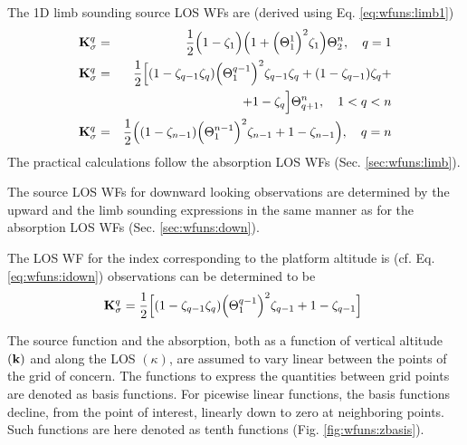   \label{sec:wfuns:limb2}
  The 1D limb sounding source LOS WFs are (derived using Eq.
  \ref{eq:wfuns:limb1})
  \begin{eqnarray}
    \mathbf{K}_{\sigma}^q & = & \frac{1}{2} \Big(1-\zeta_1\Big) \Big(1+
        \Big( \Theta^1_1 \Big)^2\zeta_1 \Big) \Theta^n_2, 
                                                    \quad q=1  \nonumber \\
    \mathbf{K}_{\sigma}^q & = & \frac{1}{2} \Big[ (1-\zeta_{q-1}\zeta_q)
           \Big(\Theta^{q-1}_{1}\Big)^2\zeta_{q-1}\zeta_q + 
           (1-\zeta_{q-1})\zeta_q + \nonumber \\
      & & + 1-\zeta_q \Big] \Theta^n_{q+1}, \quad 1<q<n \\
    \mathbf{K}_{\sigma}^q & = & \frac{1}{2} \Big( (1-\zeta_{n-1}) \Big(
           \Theta^{n-1}_{1}\Big)^2\zeta_{n-1} + 1-\zeta_{n-1} \Big), \quad q=n \nonumber
  \end{eqnarray}
  The practical calculations follow the absorption LOS WFs (Sec.
  \ref{sec:wfuns:limb}).


  \label{sec:wfuns:down2}
  The source LOS WFs for downward looking observations are determined
  by the upward and the limb sounding expressions in the same manner
  as for the absorption LOS WFs (Sec. \ref{sec:wfuns:down}).

  The LOS WF for the index corresponding to the platform altitude is
  (cf. Eq. \ref{eq:wfuns:idown})
  observations can be determined to be
  \begin{equation}
   \mathbf{K}_{\sigma}^q = \frac{1}{2}\Big[ (1-\zeta_{q-1}\zeta_q) 
           \Big(\Theta^{q-1}_{1}\Big)^2
           \zeta_{q-1} + 1-\zeta_{q-1} \Big]\
  \end{equation}



 \label{sec:wfuns:bases}
 
 The source function and the absorption, both
 as a function of vertical altitude $(\mathbf{k})$ and along the LOS
 $(\kappa)$, are assumed to vary linear between the points of the grid
 of concern. The functions to express the quantities between grid
 points are denoted as basis functions. For picewise linear functions,
 the basis functions decline, from the point of interest, linearly
 down to zero at neighboring points. Such functions are here denoted
 as tenth functions (Fig. \ref{fig:wfuns:zbasis}).
 
